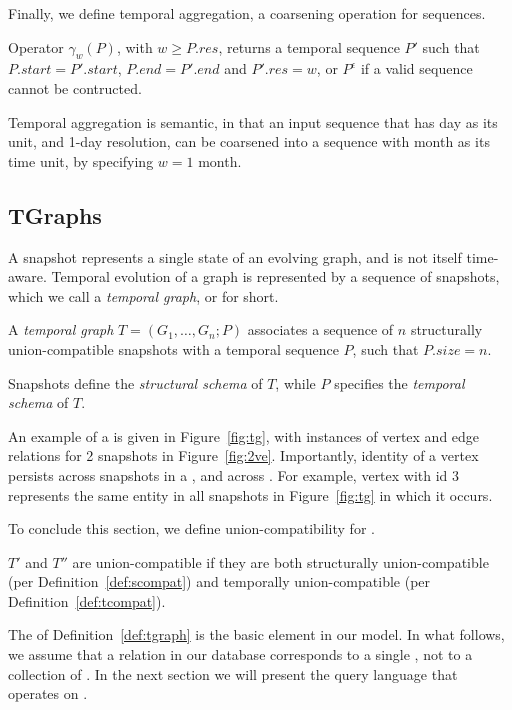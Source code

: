 Finally, we define temporal aggregation, a coarsening operation for sequences.

\begin{definition}  Operator $\gamma_w(P)$, 
with $w \geq P.res$, returns a temporal sequence $P'$ such that
$P.start = P'.start$, $P.end = P'.end$ and $P'.res = w$, or
$P^{\epsilon}$ if a valid sequence cannot be contructed.
\label{def:tgroup}
\end{definition}

Temporal aggregation is semantic, in that an input sequence that has
day as its unit, and 1-day resolution, can be coarsened into a
sequence with month as its time unit, by specifying $w = 1$ month.

\subsection{TGraphs}
\label{sec:model:tg}

A snapshot represents a single state of an evolving graph, and is not
itself time-aware.  Temporal evolution of a graph is represented by a
sequence of snapshots, which we call a {\em temporal graph}, or \tg
for short.

\begin{definition} [TGraph]
A {\em temporal graph} $T = (G_1, \ldots, G_n; P)$ associates a
sequence of $n$ structurally union-compatible snapshots with a
temporal sequence $P$, such that $P.size = n$.
\label{def:tgraph} 
\end{definition}

Snapshots define the {\em structural schema} of $T$, while $P$
specifies the {\em temporal schema} of $T$.

An example of a \tg is given in Figure~\ref{fig:tg}, with instances of
vertex and edge relations for 2 snapshots in Figure~\ref{fig:2ve}.
Importantly, identity of a vertex persists across snapshots in a \tg,
and across \tgs.  For example, vertex with id $3$ represents the same
entity in all snapshots in Figure~\ref{fig:tg} in which it occurs.

To conclude this section, we define union-compatibility for \tgs.

\begin{definition} 
\label{def:tuc} 
$T'$ and $T''$ are union-compatible \tgs if they are both
structurally union-compatible (per Definition~\ref{def:scompat}) and
temporally union-compatible (per Definition~\ref{def:tcompat}).
\end{definition}

The \tg of Definition~\ref{def:tgraph} is the basic element in our
model.  In what follows, we assume that a relation in our database
corresponds to a single \tg, not to a collection of \tgs.  In the next
section we will present the \ql query language that operates on \tgs.




